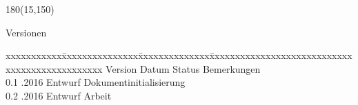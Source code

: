 
\begin{textblock}{180}(15,150)
\color{black}
\begin{huge}
Versionen
\end{huge}
\vspace{10mm}

\fontsize{10pt}{18pt}\selectfont
\begin{tabbing}
xxxxxxxxxxx\=xxxxxxxxxxxxxxx\=xxxxxxxxxxxxxx\=xxxxxxxxxxxxxxxxxxxxxxxxxxxxxxxxxxxxxxxxxxxxxxx \kill
Version	\> Datum	\> Status		\> Bemerkungen		\\
0.1	.2016	\> Entwurf		\> Dokumentinitialisierung	\\	
0.2	.2016	\> Entwurf		\> Arbeit	\\	
\end{tabbing}

\end{textblock}
